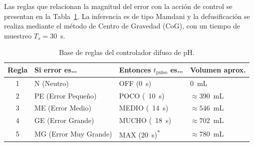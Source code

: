 \begin{table}[H]
\centering
\caption{Funciones de membresía de la variable de salida --- Tiempo de pulso interno $t_\text{int}$ [s] y efectivo ($\times k_\text{pulso}=2$).}
\label{tab:mf_salida}
\renewcommand{\arraystretch}{1.3}
\small
{}
\end{table}

Las reglas que relacionan la magnitud del error con la acción de control se presentan
en la Tabla~\ref{tab:reglas_ph}. La inferencia es de tipo Mamdani y la defusificación se realiza
mediante el método de Centro de Gravedad (CoG), con un tiempo de muestreo
$T_s = 30$~s.

\begin{table}[H]
\centering
\caption{Base de reglas del controlador difuso de pH.}
\label{tab:reglas_ph}
\renewcommand{\arraystretch}{1.3}
\small
\begin{tabular}{clll}
\toprule
\textbf{Regla} & \textbf{Si error es\ldots} & \textbf{Entonces $t_{\text{pulso}}$ es\ldots} & \textbf{Volumen aprox.} \\
\midrule
1 & N  (Neutro)           & OFF   (0~s)    & 0~mL \\
2 & PE (Error Pequeño)    & POCO  (~10~s)  & $\approx 390$~mL \\
3 & ME (Error Medio)      & MEDIO (~14~s)  & $\approx 546$~mL \\
4 & GE (Error Grande)     & MUCHO (~18~s)  & $\approx 702$~mL \\
5 & MG (Error Muy Grande) & MAX   (20~s)\textsuperscript{*} & $\approx 780$~mL \\
\bottomrule
\end{tabular}
\end{table}

